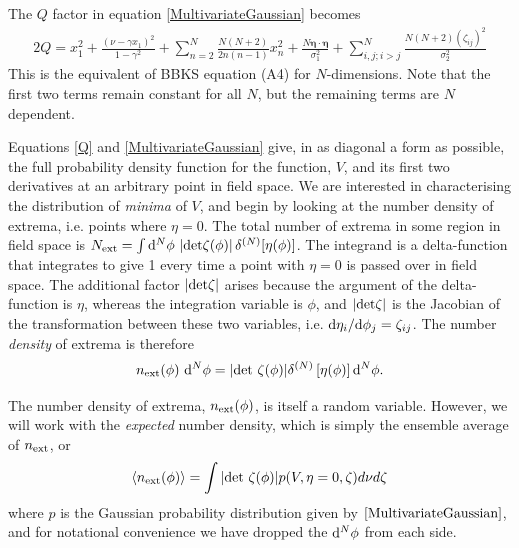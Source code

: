 \documentclass[12pt]{article}
\begin{document}
The $Q$ factor in equation \eqref{MultivariateGaussian} becomes
%
\begin{equation} \label{Q}
\begin{split}
2Q = x_1^2 + \frac{(\nu-\gamma x_1)^2}{1-\gamma^2}+\sum_{n=2}^N\frac{N(N+2)}{2n(n-1)}x_n^2 + \frac{N \pmb{\eta}\cdot \pmb{\eta}}{\sigma_1^2} + \sum_{i,j;i > j}^N\frac{N(N+2)(\zeta_{ij})^2}{\sigma_2^2}
\end{split}
\end{equation}
%
This is the equivalent of BBKS equation (A4) for $N$-dimensions. Note that the first two terms remain constant for all $N$, but the remaining terms are $N$ dependent.

Equations \eqref{Q} and \eqref{MultivariateGaussian} give, in as diagonal a form as possible, the full probability density function for the function, $V$, and its first two derivatives at an arbitrary point in field space. We are interested in characterising the distribution of \emph{minima} of $V$, and begin by looking at the number density of extrema, i.e. points where $\eta=0$. The total number of extrema in some region in field space is $N_{\rm ext} = \int {\rm d}^N\phi \, \left| {\rm det}\zeta(\phi)\right|\delta^{(N)}[\eta(\phi)]$. The integrand is a delta-function that integrates to give 1 every time a point with $\eta=0$ is passed over in field space. The additional factor $\left| {\rm det \zeta} \right|$ arises because the argument of the delta-function is $\eta$, whereas the integration variable is $\phi$, and $|{\rm det}\zeta|$ is the Jacobian of the transformation between these two variables, i.e. ${\rm d}\eta_i/{\rm d}\phi_j = \zeta_{ij}$. The number \emph{density} of extrema is therefore
%
\begin{equation}
n_{\rm ext}(\phi) \,\,{\rm d}^N \phi= |{\rm det}\,\, \zeta(\phi)| \delta^{(N)}\left[ \eta(\phi)\right] {\rm d}^N \phi.
\end{equation}

%
The number density of extrema, $n_{\rm ext}(\phi)$, is itself a random variable. However, we will work with the \emph{expected} number density, which is simply the ensemble average of $n_{\rm ext}$, or
% 
\begin{equation} \label{NumberDensity}
\langle n_{\rm ext}(\phi)  \rangle= \int |{\rm det}\,\, \zeta(\phi)| p(V,\eta=0,\zeta)d\nu d\zeta
\end{equation}
where $p$ is the Gaussian probability distribution given by $\eqref{MultivariateGaussian}$, and for notational convenience we have dropped the ${\rm d}^N \phi$ from each side.
\end{document}

